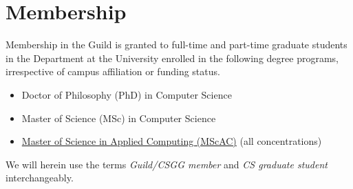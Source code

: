 \section{Membership}\label{sec:members}
Membership in the Guild is granted to full-time and part-time graduate students
in the Department at the University enrolled in the following degree programs,
irrespective of campus affiliation or funding status.
\begin{itemize}
    \item Doctor of Philosophy (PhD) in Computer Science
    \item Master of Science (MSc) in Computer Science
    \item \href{https://mscac.utoronto.ca/}{Master of Science in Applied Computing (MScAC)} (all concentrations)
\end{itemize}
We will herein use the terms \textit{Guild/CSGG member} and \textit{CS graduate student} interchangeably.
